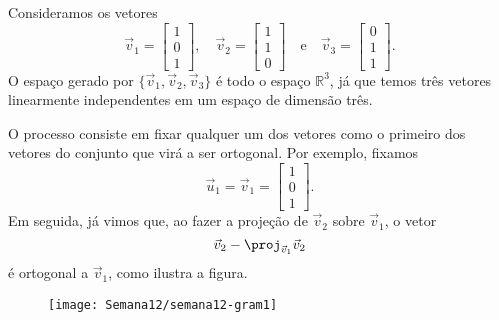 \begin{ex}
Consideramos os vetores
\begin{equation}
\vec{v}_1 =
\begin{bmatrix}
1 \\ 0 \\ 1
\end{bmatrix}, \quad
\vec{v}_2 =
\begin{bmatrix}
1 \\ 1 \\ 0
\end{bmatrix} \quad \text{e} \quad
\vec{v}_3 =
\begin{bmatrix}
0 \\ 1 \\ 1
\end{bmatrix}.
\end{equation} O espaço gerado por $\{\vec{v}_1, \vec{v}_2, \vec{v}_3 \}$ é todo o espaço $\mathbb{R}^3$, já que temos três vetores  linearmente independentes em um espaço de dimensão três.

O processo consiste em fixar qualquer um dos vetores como o primeiro dos vetores do conjunto que virá a ser ortogonal. Por exemplo, fixamos
\begin{equation}
\vec{u}_1 = \vec{v}_1 =
\begin{bmatrix}
1 \\ 0 \\ 1
\end{bmatrix}.
\end{equation} Em seguida, já vimos que, ao fazer a projeção de $\vec{v}_2$ sobre $\vec{v}_1$, o vetor
\begin{equation}
\vec{v}_2 - \proj_{\vec{v}_1} \vec{v}_2
\end{equation} é ortogonal a $\vec{v}_1$, como ilustra a figura.
\begin{figure}[h!]
\begin{center}
\texttt{[image: Semana12/semana12-gram1]}
\end{center}
\end{figure}


\end{ex}
